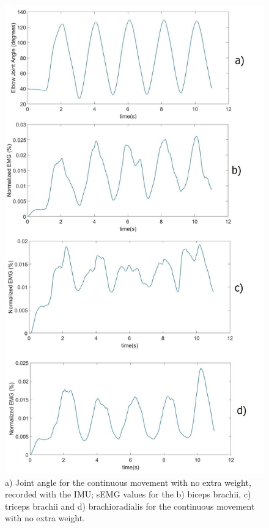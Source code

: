 \documentclass[letterpaper, 10 pt, conference]{ieeeconf}  %
\begin{document}
\begin{figure}[thpb]
\vspace{2mm}
      \centering
      \includegraphics[width=0.98\columnwidth]{Images/Angle_and_EMGs.jpg}
      \caption{a) Joint angle for the continuous movement with no extra weight, recorded with the IMU; sEMG values for the b) biceps brachii, c) triceps brachii and d) brachioradialis for the continuous movement with no extra weight. }
      \label{Angle and EMG}
   \end{figure}
\end{document}
